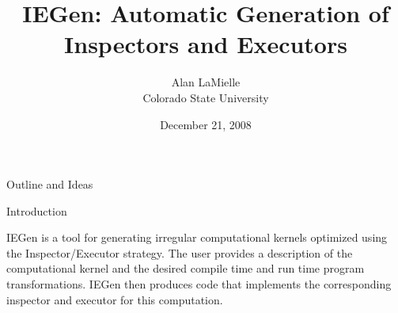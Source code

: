 \documentclass{book}
\title{IEGen: Automatic Generation of Inspectors and Executors}
\author{Alan LaMielle \\
	Colorado State University}
\date{December 21, 2008}
\begin{document}
\maketitle

\begin{chapter}{Outline and Ideas}

\end{chapter}

\begin{chapter}{Introduction}

IEGen is a tool for generating irregular computational kernels optimized using the Inspector/Executor strategy.
The user provides a description of the computational kernel and the desired compile time and run time program transformations.
IEGen then produces code that implements the corresponding inspector and executor for this computation.

\end{chapter}
\end{document}
